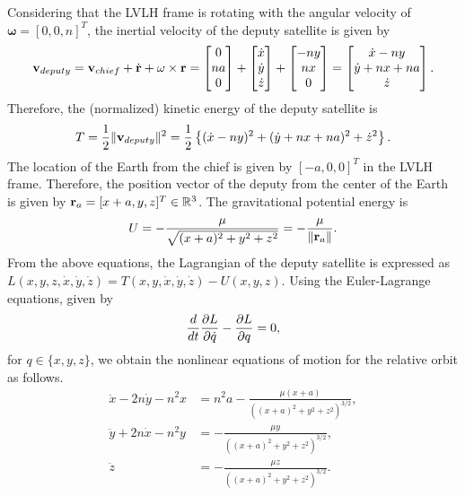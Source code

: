 Considering that the LVLH frame is rotating with the angular velocity of $\mathbf{\omega}=[0,0,n]^T$, the inertial velocity of the deputy satellite is given by
\begin{align*}
\mathbf{v}_{deputy}
=
\mathbf{v}_{chief} + \dot{\mathbf{r}} + \mathbf{\omega}\times \mathbf{r} = 
\begin{bmatrix}
0 \\ na \\ 0
\end{bmatrix}
+
\begin{bmatrix}
\dot x \\ \dot y \\ \dot z
\end{bmatrix}
+
\begin{bmatrix}
-n y \\ nx \\ 0
\end{bmatrix}
=
\begin{bmatrix}
\dot x - ny \\ \dot y + nx + na \\ \dot z
\end{bmatrix}.
\end{align*}
Therefore, the (normalized) kinetic energy of the deputy satellite is 
\begin{align*}
T = \frac{1}{2}\|\mathbf{v}_{deputy}\|^2 = \frac{1}{2} \left\{ (\dot x -ny)^2+(\dot y + nx +na)^2 + \dot z^2 \right\}.
\end{align*}
The location of the Earth from the chief is given by $[-a,0,0]^T$ in the LVLH frame. Therefore, the position vector of the deputy from the center of the Earth is given by 
$\mathbf{r}_a=[x+a,y,z]^T\in\mathbb{R}^3$. The gravitational potential energy is 
\begin{align*}
U = -\frac{\mu}{\sqrt{(x+a)^2 + y^2 + z^2}} = -\frac{\mu}{\|\mathbf{r}_a\|}.
\end{align*}
From the above equations, the Lagrangian of the deputy satellite is expressed as $L(x,y,z,\dot x,\dot y ,\dot z) = T(x,y,\dot x,\dot y,\dot z)- U(x,y,z)$. Using the Euler-Lagrange equations, given by
\begin{align*}
\frac{d}{dt}\frac{\partial L}{\partial \dot q}-\frac{\partial L}{\partial q}=0,
\end{align*}
for $q\in\{x,y,z\}$, we obtain the nonlinear equations of motion for the relative orbit as follows.
\begin{align}
\ddot x - 2n\dot y -n^2 x&=n^2 a - \frac{\mu (x+a)}{((x+a)^2 + y^2 + z^2)^{3/2}},\label{eqn:ddotx}\\
\ddot y + 2n\dot x -n^2 y &=   - \frac{\mu y}{((x+a)^2 + y^2 + z^2)^{3/2}},\label{eqn:ddoty}\\
\ddot z &= - \frac{\mu z}{((x+a)^2 + y^2 + z^2)^{3/2}}.\label{eqn:ddotz}
\end{align}

